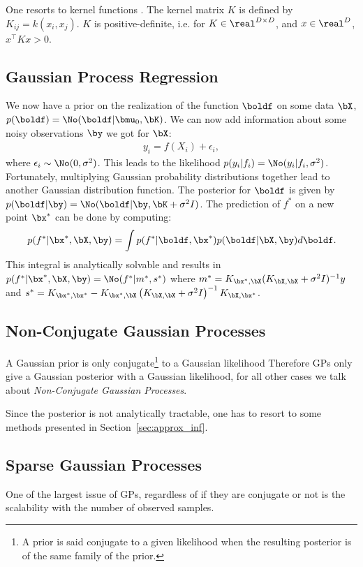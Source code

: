 One resorts to kernel functions .
The kernel matrix $K$ is defined by $K_{ij} = k(x_i, x_j)$.
$K$ is positive-definite, i.e. for $K\in \real^{D\times D}$, and $x\in \real^D$, $x^\top K x > 0$.

\subsection{Gaussian Process Regression}

We now have a prior on the realization of the function $\boldf$ on some data $\bX$, $p(\boldf) = \No(\boldf|\bmu_0, \bK)$.
We can now add information about some noisy observations $\by$ we got for $\bX$:
\begin{align}
y_i = f(X_i) + \epsilon_i,
\end{align}
where $\epsilon_i \sim \No(0,\sigma^2)$.
This leads to the likelihood $p(y_i|f_i) = \No(y_i|f_i, \sigma^2)$.
Fortunately, multiplying Gaussian probability distributions together lead to another Gaussian distribution function.
The posterior for $\boldf$ is given by $p(\boldf|\by) = \No(\boldf|\by, \bK + \sigma^2 I)$.
The prediction of $f^*$ on a new point $\bx^*$ can be done by computing:
\begin{align}
p(f^*|\bx^*,\bX,\by) = \int p(f^*|\boldf,\bx^*)p(\boldf|\bX,\by)d\boldf.
\end{align}	
This integral is analytically solvable and results in $p(f^*|\bx^*,\bX,\by)=\No(f^*|m^*,s^*)$ where $m^* = K_{\bx^*,\bX}(K_{\bX,\bX} + \sigma^{2}I)^{-1}y$ and $s^*=K_{\bx^*,\bx^*} - K_{\bx^*,\bX}\left(K_{\bX,\bX}+\sigma^2I\right)^{-1}K_{\bX,\bx^*}$.

\subsection{Non-Conjugate Gaussian Processes}

A Gaussian prior is only conjugate\footnote{A prior is said conjugate to a given likelihood when the resulting posterior is of the same family of the prior.} to a Gaussian likelihood
Therefore \ac{GPs} only give a Gaussian posterior with a Gaussian likelihood, for all other cases we talk about \textit{Non-Conjugate Gaussian Processes}.

Since the posterior is not analytically tractable, one has to resort to some methods presented in Section~\ref{sec:approx_inf}.

\subsection{Sparse Gaussian Processes}
One of the largest issue of \ac{GPs}, regardless of if they are conjugate or not is the scalability with the number of observed samples.



